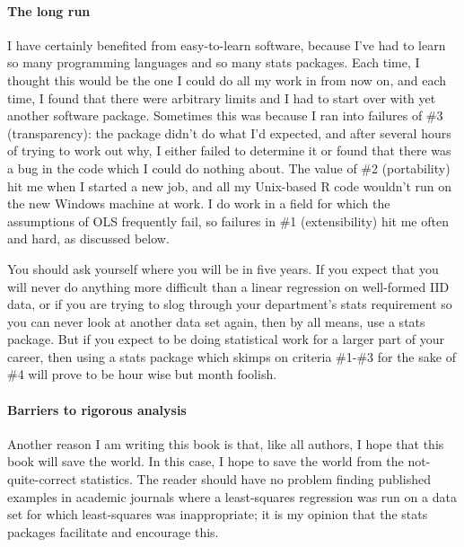 \paragraph{The long run}
I have certainly benefited from easy-to-learn software, because I've had to learn
so many programming languages and so many stats packages. Each time, I thought
this would be the one I could do all my work in from now on, and each time, I
found that there were arbitrary limits and I had to start over with yet another software package.
Sometimes this was because I ran into failures of \#3 (transparency): the package
didn't do what I'd expected, and after several hours of trying to work
out why, I either failed to determine it or found that there was a bug
in the code which I could do nothing about. The value of \#2 (portability) hit me
when I started a new job, and all my Unix-based R code wouldn't run
on the new Windows machine at work. I do work in a field for which the
assumptions of OLS frequently fail, so failures in \#1 (extensibility) hit me often and hard,
as discussed below.

You should ask yourself where you will be in five years. If you expect that you will never do
anything more difficult than a linear regression on well-formed IID data, or if you are trying to slog
through your department's stats requirement so you can never look at another data set again, then by all means, use a
stats package. But if you expect to be doing statistical work for a larger part of your career, then using a
stats package which skimps on criteria \#1-\#3 for the sake of \#4 will prove to be
hour wise but month foolish. 

\paragraph{Barriers to rigorous analysis}
Another reason I am writing this book is that, like all authors, I hope
that this book will save the world. In this case, I hope to save the
world from the not-quite-correct statistics.  The reader should have
no problem finding published examples in academic journals where a
least-squares regression was run on a data set for which least-squares
was inappropriate; it is my opinion that the stats packages facilitate
and encourage this.

